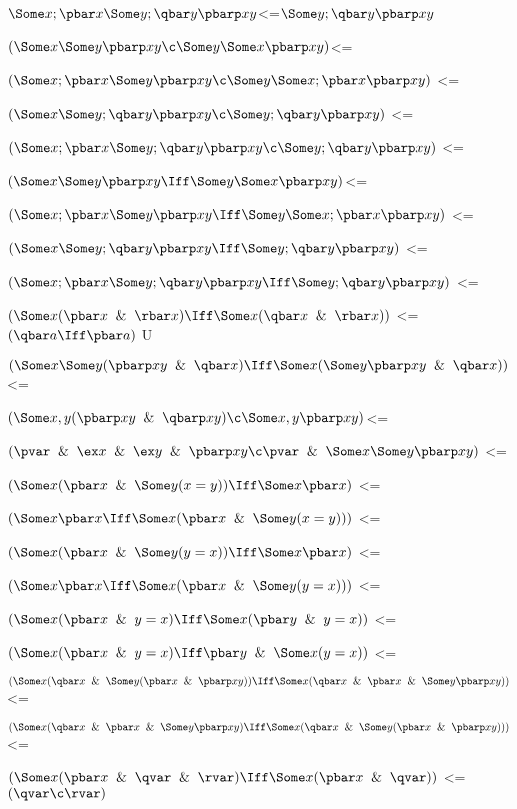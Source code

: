 $\Some x; \pbar x \Some y; \qbar y \pbarp xy$<=$\Some y;\qbar y\pbarp xy$

$(\Some x \Some y \pbarp xy \c \Some y \Some x \pbarp xy)$<=

$(\Some x;\pbar x \Some y \pbarp xy\c\Some y \Some x;\pbar x\pbarp xy)$ <=

$(\Some x \Some y; \qbar y \pbarp xy \c \Some y; \qbar y\pbarp xy)$ <=

$(\Some x; \pbar x \Some y; \qbar y \pbarp xy\c\Some y;\qbar y\pbarp xy)$ <=

$(\Some x \Some y \pbarp xy \Iff \Some y \Some x \pbarp xy)$<=

$(\Some x;\pbar x \Some y \pbarp xy\Iff\Some y \Some x;\pbar x\pbarp xy)$ <=

$(\Some x \Some y; \qbar y \pbarp xy \Iff \Some y; \qbar y\pbarp xy)$ <=

$(\Some x; \pbar x \Some y; \qbar y \pbarp xy\Iff\Some y;\qbar y\pbarp xy)$ <=

$(\Some x (\pbar x \And \rbar x)\Iff \Some x (\qbar x\And\rbar x))$ <= $(\qbar a \Iff \pbar a)$ U 

$(\Some x \Some y (\pbarp xy \And \qbar x)\Iff\Some x(\Some y \pbarp xy \And \qbar x))$ <=

$(\Some x,y (\pbarp xy \And \qbarp xy) \c \Some x,y\pbarp xy )$<=

$(\pvar \And \ex x \And \ex y \And \pbarp xy \c \pvar \And\Some x \Some y \pbarp xy)$ <=

$(\Some x (\pbar x \And \Some y (x = y))\Iff \Some x \pbar x)$ <=

$(\Some x \pbar x \Iff \Some x (\pbar x\And \Some y (x = y)))$ <=

$(\Some x (\pbar x \And \Some y (y = x))\Iff \Some x \pbar x)$ <=

$(\Some x \pbar x \Iff \Some x (\pbar x\And \Some y (y = x)))$ <=

$(\Some x (\pbar x \And y = x) \Iff  \Some x (\pbar y \And y = x))$ <=

$(\Some x (\pbar x \And y = x) \Iff  \pbar y \And \Some x (y = x))$ <=

$(\Some x (\qbar x \And \Some y (\pbar x  \And \pbarp x y)) \Iff \Some x (\qbar x \And \pbar x \And \Some y \pbarp x y))$ <=

$( \Some x (\qbar x \And \pbar x \And \Some y \pbarp x y) \Iff \Some x (\qbar x \And \Some y (\pbar x  \And \pbarp x y)) )$ <=

$(\Some x (\pbar x \And \qvar \And \rvar) \Iff \Some x (\pbar x \And \qvar))$ <= $(\qvar \c \rvar )$ 

